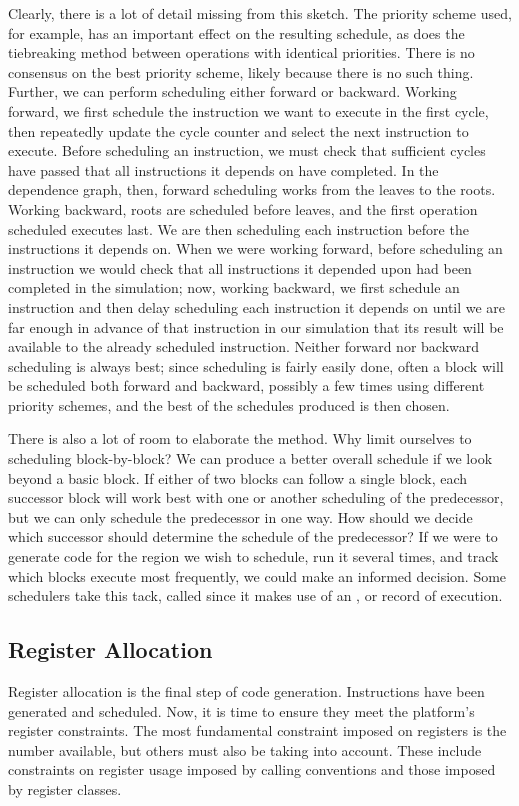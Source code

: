 Clearly, there is a lot of detail missing from this sketch. The priority scheme used, for example, has an important effect on the resulting schedule, as does the tiebreaking method between operations with identical priorities. There is no consensus on the best priority scheme, likely because there is no such thing. Further, we can perform scheduling either forward or backward. Working forward, we first schedule the instruction we want to execute in the first cycle, then repeatedly update the cycle counter and select the next instruction to execute. Before scheduling an instruction, we must check that sufficient cycles have passed that all instructions it depends on have completed. In the dependence graph, then, forward scheduling works from the leaves to the roots. Working backward, roots are scheduled before leaves, and the first operation scheduled executes last. We are then scheduling each instruction before the instructions it depends on. When we were working forward, before scheduling an instruction we would check that all instructions it depended upon had been completed in the simulation; now, working backward, we first schedule an instruction and then delay scheduling each instruction it depends on until we are far enough in advance of that instruction in our simulation that its result will be available to the already scheduled instruction. Neither forward nor backward scheduling is always best; since scheduling is fairly easily done, often a block will be scheduled both forward and backward, possibly a few times using different priority schemes, and the best of the schedules produced is then chosen.

There is also a lot of room to elaborate the method. Why limit ourselves to scheduling block-by-block? We can produce a better overall schedule if we look beyond a basic block. If either of two blocks can follow a single block, each successor block will work best with one or another scheduling of the predecessor, but we can only schedule the predecessor in one way. How should we decide which successor should determine the schedule of the predecessor? If we were to generate code for the region we wish to schedule, run it several times, and track which blocks execute most frequently, we could make an informed decision. Some schedulers take this tack, called  since it makes use of an , or record of execution.%

\subsection{Register Allocation}
Register allocation is the final step of code generation. Instructions have been generated and scheduled. Now, it is time to ensure they meet the platform's register constraints. The most fundamental constraint imposed on registers is the number available, but others must also be taking into account. These include constraints on register usage imposed by calling conventions and those imposed by register classes.

